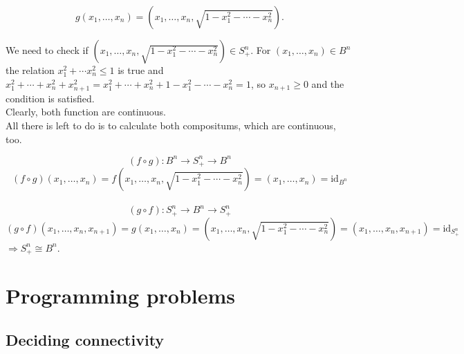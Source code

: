 \documentclass[a4paper,11pt]{article}
\begin{document}
$$ g(x_1, \ldots, x_n) = \left( x_1, \ldots, x_n, \sqrt{ 1 - x_1^2 - \cdots - x_n^2} \right). $$

\noindent
We need to check if $\left( x_1, \ldots, x_n, \sqrt{ 1 - x_1^2 - \cdots - x_n^2} \right) \in S_{+}^{n}$. For $(x_1, \ldots, x_n) \in B^n$ the relation $x_1^2 + \cdots x_n^2 \leq 1 $ is true and $x_1^2 + \cdots + x_n^2 + x_{n + 1}^2 = x_1^2 + \cdots + x_n^2 + 1 - x_1^2 - \cdots - x_n^2 = 1$, so $x_{n+1} \geq 0$ and the condition is satisfied.
\\
Clearly, both function are continuous. 
\\
All there is left to do is to calculate both compositums, which are continuous, too.

$$ (f \circ g): B^n \to S_{+}^{n} \to B^n $$
$$ (f \circ g)(x_1, \ldots, x_n) = f \left(x_1, \ldots, x_n, \sqrt{ 1 - x_1^2 - \cdots - x_n^2} \right) = (x_1, \ldots, x_n) = \text{id}_{B^n}$$
\\
$$ (g \circ f): S_{+}^{n} \to B^n \to S_{+}^{n} $$
$$ (g \circ f)(x_1, \ldots, x_n, x_{n + 1}) = g(x_1, \ldots, x_n) = \left(x_1, \ldots, x_n, \sqrt{ 1 - x_1^2 - \cdots - x_n^2} \right) = (x_1, \ldots, x_n, x_{n + 1}) = \text{id}_{S_{+}^{n}}$$
\noindent
$ \Longrightarrow S_{+}^{n} \cong B^n.$

\section{Programming problems}

\subsection{Deciding connectivity}
\end{document}
